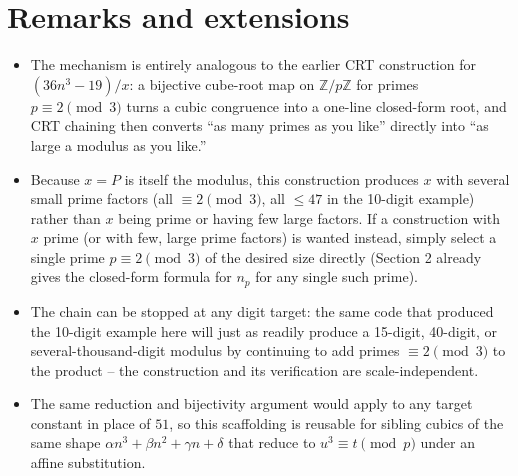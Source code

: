 \documentclass[11pt]{article}
\begin{document}
\section{Remarks and extensions}

\begin{itemize}
\item The mechanism is entirely analogous to the earlier CRT
construction for $(36n^3-19)/x$: a bijective cube-root map on
$\mathbb{Z}/p\mathbb{Z}$ for primes $p\equiv 2\pmod 3$ turns a cubic
congruence into a one-line closed-form root, and CRT chaining then
converts ``as many primes as you like'' directly into ``as large a
modulus as you like.''
\item Because $x=P$ is itself the modulus, this construction produces
$x$ with several small prime factors (all $\equiv 2\pmod 3$, all $\le
47$ in the 10-digit example) rather than $x$ being prime or having few
large factors. If a construction with $x$ prime (or with few, large
prime factors) is wanted instead, simply select a single prime
$p \equiv 2\pmod 3$ of the desired size directly (Section 2 already
gives the closed-form formula for $n_p$ for any single such prime).
\item The chain can be stopped at any digit target: the same code that
produced the 10-digit example here will just as readily produce a
15-digit, 40-digit, or several-thousand-digit modulus by continuing to
add primes $\equiv 2 \pmod 3$ to the product -- the construction and its
verification are scale-independent.
\item The same reduction and bijectivity argument would apply to any
target constant in place of $51$, so this scaffolding is reusable for
sibling cubics of the same shape $\alpha n^3+\beta n^2 + \gamma n +
\delta$ that reduce to $u^3 \equiv t \pmod p$ under an affine
substitution.
\end{itemize}
\end{document}
